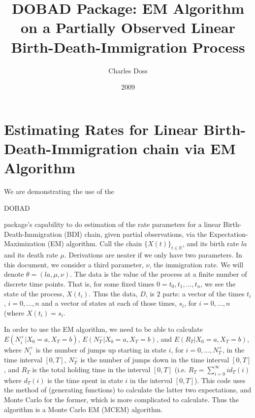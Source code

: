 \documentclass[12pt]{article}
\title{DOBAD Package: 
EM Algorithm on a Partially Observed Linear Birth-Death-Immigration Process}
\author{Charles Doss}
\date{2009}
\def\R{\mathbb{R}}
\begin{document}
\begin{titlepage}
\maketitle
\end{titlepage}


\vspace{-3.7mm} 






\part{Estimating Rates for Linear Birth-Death-Immigration chain via EM
  Algorithm}

We are demonstrating the use of the
\begin{verb}
DOBAD
\end{verb}
package's capability to do estimation of the rate parameters for a
linear Birth-Death-Immigration (BDI) chain, given partial
observations, via the Expectation-Maximization (EM) algorithm.  Call
the chain $\{X(t)\}_{t \in \R}$, and its birth rate $la$ and its death
rate $\mu$.  Derivations are neater if we only have two parameters.
In this document, we consider a third parameter, $\nu$, the
immigration rate.  We will denote $\theta = (la, \mu, \nu)$.  The data
is the value of the process at a finite number of discrete time
points.  That is, for some fixed times $0=t_0, t_1, \ldots, t_n$, we
see the state of the process, $X(t_i)$.  Thus the data, $D$, is $2$
parts: a vector of the times $t_i$, $i= 0, \ldots, n$ and a vector of
states at each of those times, $s_i$, for $i=0, \ldots, n$ (where
$X(t_i) = s_i$.

In order to use the EM algorithm, we need to be able to calculate
$E(N_i^+| X_0=a, X_T=b)$, $E(N_T^-| X_0=a, X_T=b)$, and $E(R_T| X_0=a,
X_T=b)$, where $N_i^+$ is the number of jumps up starting in state
$i$, for $i=0,\ldots, N_T^+$, in the time interval $[0,T]$, $N_T^-$ is
the number of jumps down in the time interval $[0,T]$, and $R_T$ is
the total holding time in the interval $[0,T]$ (i.e.  $R_T =
\sum_{i=0}^\infty id_T(i)$ where $d_T(i)$ is the time spent in state
$i$ in the interval $[0,T]$).  This code uses the method of
\citet{DSHKM2010EM} (generating functions) to calculate the latter two
expectations, and Monte Carlo for the former, which is more
complicated to calculate.  Thus the algorithm is a Monte Carlo EM
(MCEM) algorithm.
\end{document}

